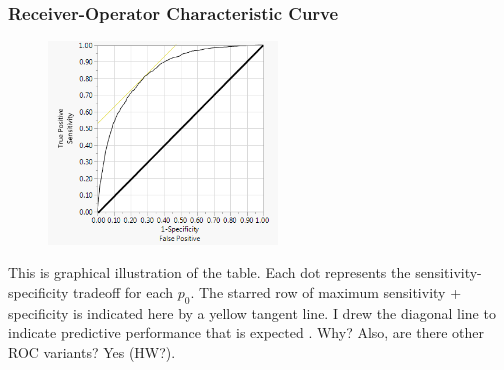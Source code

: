 \documentclass[slides]{beamer} %
\begin{document}
\begin{frame}\frametitle{Receiver-Operator Characteristic Curve}

\vspace{-0.2cm}
\begin{figure}
\centering
\hspace{-0.5cm}\includegraphics[width=2.4in]{roc_curve.png}
\end{figure}

\small
\vspace{-0.3cm}
This is graphical illustration of the table. Each dot represents the sensitivity-specificity tradeoff for each $p_0$. \pause The starred row of maximum sensitivity + specificity is indicated here by a yellow tangent line. \pause I drew the diagonal line to indicate predictive performance that is expected . Why? \pause Also, are there other ROC variants? \pause Yes (HW?).

\end{frame}
\end{document}
